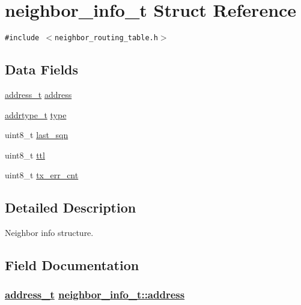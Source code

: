 \hypertarget{structneighbor__info__t}{
\section{neighbor\_\-info\_\-t Struct Reference}
\label{structneighbor__info__t}
}
{\tt \#include $<$neighbor\_\-routing\_\-table.h$>$}

\subsection*{Data Fields}
\begin{CompactItemize}
\item 
\hyperlink{address_8h_65ce5a1faf29ab669a1d3dc6ce26c2ab}{address\_\-t} \hyperlink{structneighbor__info__t_790af312906f9cd4f8859bae27cc7780}{address}
\item 
\hyperlink{address_8h_faf76b5591da0abd0584dec411d0551d}{addrtype\_\-t} \hyperlink{structneighbor__info__t_fc0346ec8be9b8c1fd4f30dd92d1668a}{type}
\item 
uint8\_\-t \hyperlink{structneighbor__info__t_5298c5fd0a4147b239272dcb5c842922}{last\_\-sqn}
\item 
uint8\_\-t \hyperlink{structneighbor__info__t_4ca0945404f5041f21776c404fb38c88}{ttl}
\item 
uint8\_\-t \hyperlink{structneighbor__info__t_b830b0bdf5b001e8e554c771f5996004}{tx\_\-err\_\-cnt}
\end{CompactItemize}


\subsection{Detailed Description}
Neighbor info structure. 



\subsection{Field Documentation}
\hypertarget{structneighbor__info__t_790af312906f9cd4f8859bae27cc7780}{
\subsubsection[address]{\setlength{\rightskip}{0pt plus 5cm}\hyperlink{address_8h_65ce5a1faf29ab669a1d3dc6ce26c2ab}{address\_\-t} \hyperlink{structneighbor__info__t_790af312906f9cd4f8859bae27cc7780}{neighbor\_\-info\_\-t::address}}}
\label{structneighbor__info__t_790af312906f9cd4f8859bae27cc7780}


